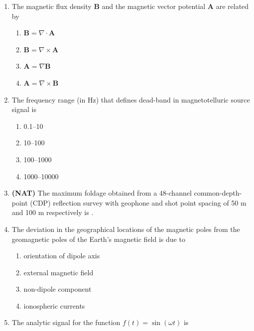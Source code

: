 \documentclass[journal,12pt,onecolumn]{IEEEtran}
\theoremstyle{remark}
\begin{document}
\begin{enumerate}
\item The magnetic flux density \( \mathbf{B} \) and the magnetic vector potential \( \mathbf{A} \) are related by

\begin{multicols}{2}
\begin{enumerate}
\item \( \mathbf{B} = \nabla \cdot \mathbf{A} \)  
\item \( \mathbf{B} = \nabla \times \mathbf{A} \)  
\item \( \mathbf{A} = \nabla \mathbf{B} \)  
\item \( \mathbf{A} = \nabla \times \mathbf{B} \)  
\end{enumerate}
\end{multicols}

\item The frequency range (in Hz) that defines dead-band in magnetotelluric source signal is

\begin{multicols}{2}
\begin{enumerate}
\item 0.1--10  
\item 10--100  
\item 100--1000  
\item 1000--10000  
\end{enumerate}
\end{multicols}

\item \textbf{(NAT)} The maximum foldage obtained from a 48-channel common-depth-point (CDP) reflection survey with geophone and shot point spacing of 50 m and 100 m respectively is \underline{\hspace{2cm}}.

\item The deviation in the geographical locations of the magnetic poles from the geomagnetic poles of the Earth's magnetic field is due to

\begin{enumerate}
\item orientation of dipole axis  
\item external magnetic field  
\item non-dipole component  
\item ionospheric currents  
\end{enumerate}

\item The analytic signal for the function \( f(t) = \sin(\omega t) \) is


\end{enumerate}
\end{document}
